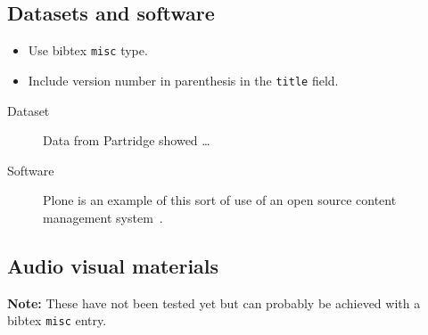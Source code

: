 \documentclass[12pt,oneside]{book} %
\begin{document}
\subsection{Datasets and software}
\label{sec:datasets}
\begin{itemize}
\item Use bibtex \texttt{misc} type.
\item Include version number in parenthesis in the \texttt{title} field.
\end{itemize}
\begin{description}
\item[Dataset] Data from Partridge \cite{partridge_spectra_2014} showed \ldots
\item[Software] Plone is an example of this sort of use
of an open source content management
system~\cite{plone_foundation_plone_2016}.
\end{description}

\subsection{Audio visual materials}
\textbf{Note:} These have not been tested yet but can probably be achieved with a bibtex \verb#misc# entry.
\end{document}
